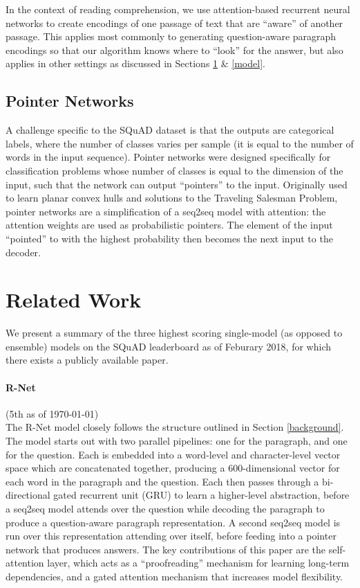 \documentclass{article}
\begin{document}
In the context of reading comprehension, we use attention-based recurrent neural networks to create encodings of one passage of text that are ``aware'' of another passage. This applies most commonly to generating question-aware paragraph encodings so that our algorithm knows where to ``look'' for the answer, but also applies in other settings as discussed in Sections \ref{related} \& \ref{model}.

\subsection{Pointer Networks}
A challenge specific to the SQuAD dataset is that the outputs are categorical labels, where the number of classes varies per sample (it is equal to the number of words in the input sequence). Pointer networks \cite{Ptr-Net} were designed specifically for classification problems whose number of classes is equal to the dimension of the input, such that the network can output ``pointers'' to the input. Originally used to learn planar convex hulls and solutions to the Traveling Salesman Problem, pointer networks are a simplification of a seq2seq model with attention: the attention weights are used as probabilistic pointers. The element of the input ``pointed'' to with the highest probability then becomes the next input to the decoder. 

\section{Related Work} \label{related}
We present a summary of the three highest scoring single-model (as opposed to ensemble) models on the SQuAD leaderboard as of Feburary 2018, for which there exists a publicly available paper. 

\paragraph{R-Net} (5th as of \today) \\
The R-Net \cite{RNet} model closely follows the structure outlined in Section \ref{background}. The model starts out with two parallel pipelines: one for the paragraph, and one for the question. Each is embedded into a word-level and character-level vector space which are concatenated together, producing a 600-dimensional vector for each word in the paragraph and the question. Each then passes through a bi-directional gated recurrent unit (GRU) \cite{GRU} to learn a higher-level abstraction, before a seq2seq model attends over the question while decoding the paragraph to produce a question-aware paragraph representation. A second seq2seq model is run over this representation attending over itself, before feeding into a pointer network that produces answers. The key contributions of this paper are the self-attention layer, which acts as a ``proofreading'' mechanism for learning long-term dependencies, and a gated attention mechanism that increases model flexibility. 
 
\end{document}
